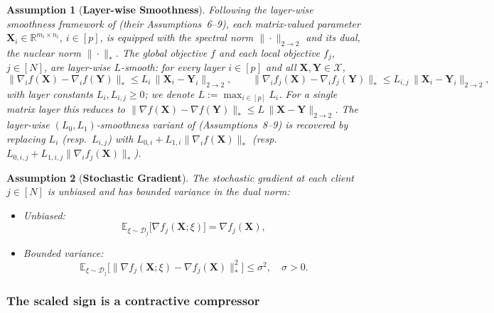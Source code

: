 \documentclass{article}
\newtheorem{assumption}{Assumption}
\begin{document}
\begin{assumption}[\textbf{Layer-wise Smoothness}]\label{as:2}
Following the layer-wise smoothness framework of \citet{gruntkowska2025error} (their Assumptions~6--9), each matrix-valued parameter $\mathbf{X}_i \in \mathbb{R}^{m_i \times n_i}$, $i \in [p]$, is equipped with the spectral norm $\|\cdot\|_{2\to 2}$ and its dual, the nuclear norm $\|\cdot\|_{*}$. The global objective $f$ and each local objective $f_j$, $j \in [N]$, are layer-wise $L$-smooth: for every layer $i \in [p]$ and all $\mathbf{X}, \mathbf{Y} \in \mathcal{X}$,
\begin{equation}
\|\nabla_i f(\mathbf{X}) - \nabla_i f(\mathbf{Y})\|_{*} \le L_i\,\|\mathbf{X}_i - \mathbf{Y}_i\|_{2\to 2}, \qquad
\|\nabla_i f_j(\mathbf{X}) - \nabla_i f_j(\mathbf{Y})\|_{*} \le L_{i,j}\,\|\mathbf{X}_i - \mathbf{Y}_i\|_{2\to 2},
\end{equation}
with layer constants $L_i, L_{i,j} \ge 0$; we denote $L := \max_{i \in [p]} L_i$. For a single matrix layer this reduces to $\|\nabla f(\mathbf{X}) - \nabla f(\mathbf{Y})\|_{*} \le L\,\|\mathbf{X} - \mathbf{Y}\|_{2\to 2}$. The layer-wise $(L_0, L_1)$-smoothness variant of \cite{gruntkowska2025error} (Assumptions~8--9) is recovered by replacing $L_i$ (resp.\ $L_{i,j}$) with $L_{0,i} + L_{1,i}\|\nabla_i f(\mathbf{X})\|_{*}$ (resp.\ $L_{0,i,j} + L_{1,i,j}\|\nabla_i f_j(\mathbf{X})\|_{*}$).
\end{assumption}

\begin{assumption}[\textbf{Stochastic Gradient}]\label{as:3}
The stochastic gradient at each client $j \in [N]$ is unbiased and has bounded variance in the dual norm:
\begin{itemize}
    \item Unbiased: \begin{equation}
    \mathbb{E}_{\xi \sim \mathcal{D}_j}\bigl[\nabla f_j(\mathbf{X};\xi)\bigr] = \nabla f_j(\mathbf{X}),
    \end{equation}
    \item Bounded variance: \begin{equation}
    \mathbb{E}_{\xi \sim \mathcal{D}_j}\bigl[\|\nabla f_j(\mathbf{X};\xi) - \nabla f_j(\mathbf{X})\|_*^2\bigr] \le \sigma^2, \quad \sigma > 0.
    \end{equation}
\end{itemize}
\end{assumption}

\subsubsection{The scaled sign is a contractive compressor}
\end{document}
